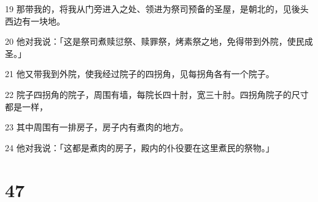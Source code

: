 \par 19 那带我的，将我从门旁进入之处、领进为祭司预备的圣屋，是朝北的，见後头西边有一块地。
\par 20 他对我说：「这是祭司煮赎愆祭、赎罪祭，烤素祭之地，免得带到外院，使民成圣。」
\par 21 他又带我到外院，使我经过院子的四拐角，见每拐角各有一个院子。
\par 22 院子四拐角的院子，周围有墙，每院长四十肘，宽三十肘。四拐角院子的尺寸都是一样，
\par 23 其中周围有一排房子，房子内有煮肉的地方。
\par 24 他对我说：「这都是煮肉的房子，殿内的仆役要在这里煮民的祭物。」

\chapter{47}

